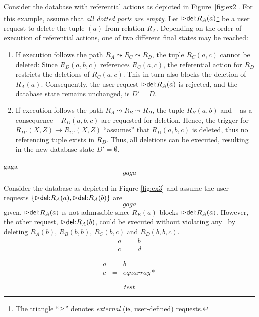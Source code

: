 \documentclass[twoside,11pt]{article}
\theoremstyle{lines}
\theoremstyle{longplain}
\begin{document}
\begin{Example}\label{ex:db1}
  Consider the database with referential actions as depicted in
  Figure~\ref{fig:ex2}. For this example, assume that \emph{all dotted
  parts are empty}.  Let $\extev \del R_A(a)$\footnote{The triangle
  ``$\extev$'' denotes \emph{external} (ie, user-defined) requests.}
  be a user request to delete the tuple $(a)$ from relation $R_A$.
  Depending on the order of execution of referential actions, one of
  two different final states may be reached: \einruecktiefe{0.8cm}
\begin{enumerate}
\item[(1)] If execution follows the path $R_A\leadsto R_C\leadsto
  R_D$, the tuple $R_C(a,c)$ cannot be deleted: Since $R_D(a,b,c)$
  references $R_C(a,c)$, the referential action for $R_D$ restricts
  the deletions of $R_C(a,c)$. This in turn also blocks the deletion
  of $R_A(a)$.  Consequently, the user request $\extev \del R_A(a)$ is
  rejected, and the database state remains unchanged, ie $D' = D$.
\item[(2)] If execution follows the path $R_A\leadsto R_B\leadsto
  R_D$, the tuple $R_B(a,b)$ and -- as a consequence -- $R_D(a,b,c)$
  are requested for deletion. Hence, the trigger for $R_D.(X,Z) \to
  R_C.(X,Z)$ ``assumes'' that $R_D(a,b,c)$ is deleted, thus no
  referencing tuple exists in $R_D$. Thus, all deletions can
  be executed, resulting in the new database state $D'=\emptyset$.
\end{enumerate} gaga
\[gaga\]\end{Example}

\begin{Example}\label{ex:refined}
Consider the database as depicted in Figure \ref{fig:ex3} and assume
  the user requests $\{\extev \del R_A(a), \extev \del R_A(b)\}$ are
\[gaga\]
  given.  $\extev \del R_A(a)$ is not admissible since $R_E(a)$ blocks
  $\extev \del R_A(a)$.  However, the other request, $\extev \del R_A(b)$,
  could be executed without violating any \ric\ by deleting $R_A(b)$,
  $R_B(b,b)$, $R_C(b,c)$ and $R_D(b,b,c)$.
  \begin{eqnarray}
    a &=& b \\
    c &=& d    
  \end{eqnarray}
\end{Example}
\begin{Example}
  \begin{eqnarray*}
    a &=& b \\
    c &=& eqnarray*    
  \end{eqnarray*}
\end{Example}
\begin{equation}
  test
\end{equation}
\end{document}
